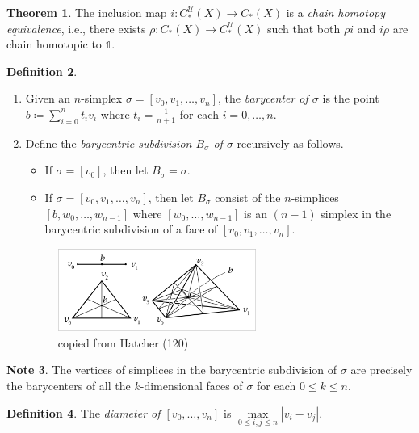 \documentclass[10pt,letterpaper,cm]{nupset}
\theoremstyle{definition}
\newtheorem{definition}{Definition}[subsection]
\newtheorem{note}[definition]{Note}
\theoremstyle{theorem}
\newtheorem{theorem}[definition]{Theorem}
\theoremstyle{remark}
\newcommand{\U}{\mathcal U}
\newcommand{\1}{\mathbb{1}}
\newcommand{\0}{\vec 0}
\begin{document}
\begin{theorem}
The inclusion map $i: C_{\ast}^{\U}(X) \to C_{\ast}(X)$ is a \textit{chain homotopy equivalence}, i.e., there exists $\rho : C_{\ast}(X) \to C_{\ast}^{\U}(X)$ such that both  $\rho i$ and  $i \rho$ are chain homotopic to $\1$.
\end{theorem}

\begin{definition} $ $
\begin{enumerate}
\item Given an $n$-simplex $\sigma = \left[v_0, v_1, \ldots, v_n\right]$, the \textit{barycenter of $\sigma$} is the point $b\coloneqq  \sum_{i=0}^n t_iv_i$ where $t_i = \frac{1}{n+1}$ for each $i=0, \ldots, n$.
\item Define the \textit{barycentric subdivision $B_{\sigma}$ of $\sigma$} recursively as follows.
\begin{itemize}
\item If $\sigma = [v_0]$, then let $B_{\sigma} = \sigma$.
\item If $\sigma = [v_0, v_1, \ldots, v_n]$, then let $B_{\sigma}$ consist of the $n$-simplices $[b, w_0, \ldots, w_{n-1}]$ where $[w_0, \ldots, w_{n-1}]$ is an $(n-1)$ simplex in the barycentric subdivision of a face of $[v_0, v_1, \ldots, v_n]$.
\end{itemize}
\begin{figure}[H]
\centering
\includegraphics[width=65mm]{Hatcher-barycentric.png}
\caption{copied from Hatcher (120) \label{overflow}}
\end{figure}
\end{enumerate}
\end{definition}

\begin{note}
The vertices of simplices in the barycentric subdivision of $\sigma$ are precisely the barycenters of all the $k$-dimensional faces of $\sigma$ for each $0\leq k\leq n$.
\end{note}


\begin{definition}
The \textit{diameter of $[v_0, \ldots, v_n]$} is $\underset{0\leq i,j\leq n}{\max}\left\lvert{v_i - v_j}\right\rvert.$
\end{definition}
\end{document}
